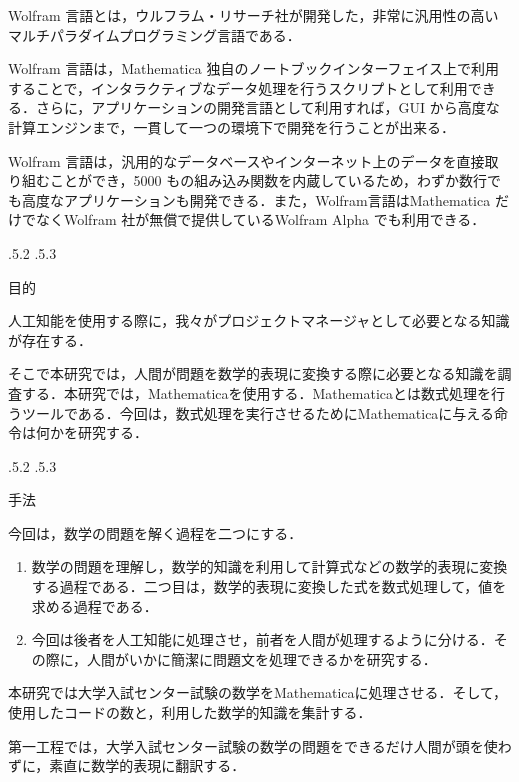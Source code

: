 \documentclass[uplatex,twocolumn]{jsarticle}
\makeatletter
\renewcommand{\section}{%
    \if@slide\clearpage\fi
    \@startsection{section}{1}{\z@}%
    {\Cvs \@plus.5\Cdp \@minus.2\Cdp}%
    {.5\Cvs \@plus.3\Cdp}%
    {\normalfont\raggedright}}
\makeatother
\begin{document}
Wolfram 言語とは，ウルフラム・リサーチ社が開発した，非常に汎用性の高いマルチパラダイムプログラミング言語である．

Wolfram 言語は，Mathematica 独自のノートブックインターフェイス上で利用することで，インタラクティブなデータ処理を行うスクリプトとして利用できる．さらに，アプリケーションの開発言語として利用すれば，GUI から高度な計算エンジンまで，一貫して一つの環境下で開発を行うことが出来る．

Wolfram 言語は，汎用的なデータベースやインターネット上のデータを直接取り組むことができ，5000 もの組み込み関数を内蔵しているため，わずか数行でも高度なアプリケーションも開発できる．また，Wolfram言語はMathematica だけでなくWolfram 社が無償で提供しているWolfram Alpha でも利用できる\cite{mitubisi}．



\section{目的}

人工知能を使用する際に，我々がプロジェクトマネージャとして必要となる知識が存在する．

そこで本研究では，人間が問題を数学的表現に変換する際に必要となる知識を調査する．本研究では，Mathematicaを使用する．Mathematicaとは数式処理を行うツールである．今回は，数式処理を実行させるためにMathematicaに与える命令は何かを研究する．






\section{手法}

今回は，数学の問題を解く過程を二つにする．
\begin{enumerate}
\item 数学の問題を理解し，数学的知識を利用して計算式などの数学的表現に変換する過程である．二つ目は，数学的表現に変換した式を数式処理して，値を求める過程である．
\item 今回は後者を人工知能に処理させ，前者を人間が処理するように分ける．その際に，人間がいかに簡潔に問題文を処理できるかを研究する．
\end{enumerate}
 
本研究では大学入試センター試験の数学をMathematicaに処理させる．そして，使用したコードの数と，利用した数学的知識を集計する．

第一工程では，大学入試センター試験の数学の問題をできるだけ人間が頭を使わずに，素直に数学的表現に翻訳する．
\end{document}

